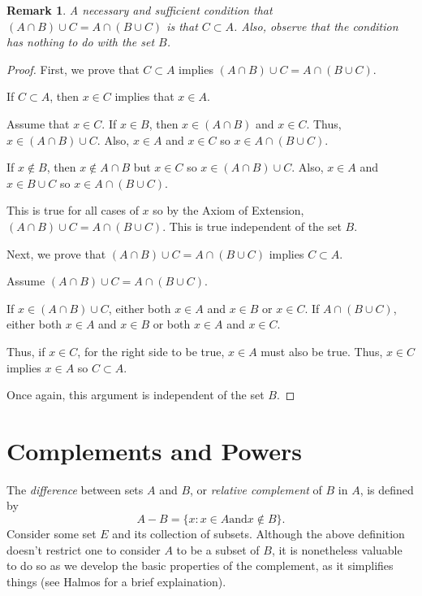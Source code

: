 \documentclass[12pt]{article}
\newtheorem{remark}{Remark}
\begin{document}
\begin{remark}
    A necessary and sufficient condition that $(A \cap B) \cup C = A \cap (B \cup C)$ is that $C \subset A$.
    Also, observe that the condition has nothing to do with the set $B$.
\end{remark}
\begin{proof}
    First, we prove that $C \subset A$ implies $(A \cap B) \cup C = A \cap (B \cup C)$.

    If $C \subset A$, then $x \in C$ implies that $x \in A$.

    Assume that $x \in C$. If $x \in B$, then $x \in (A \cap B)$ and $x \in C$. Thus, $x \in (A \cap B) \cup C$.
    Also, $x \in A$ and $x \in C$ so $x \in A \cap (B \cup C)$.

    If $x \notin B$, then $x \notin A \cap B$ but $x \in C$ so $x \in (A \cap B) \cup C$.
    Also, $x \in A$ and $x \in B \cup C$ so $x \in A \cap(B \cup C)$.

    This is true for all cases of $x$ so by the Axiom of Extension, $(A \cap B) \cup C = A \cap (B \cup C)$.
    This is true independent of the set $B$.

    Next, we prove that $(A \cap B) \cup C = A \cap (B \cup C)$ implies $C \subset A$.

    Assume $(A \cap B) \cup C = A \cap (B \cup C)$.

    If $x \in (A \cap B) \cup C$, either both $x \in A$ and $x \in B$ or $x \in C$.
    If $A \cap (B \cup C)$, either both $x \in A$ and $x \in B$ or both $x \in A$ and $x \in C$.

    Thus, if $x \in C$, for the right side to be true, $x \in A$ must also be true. Thus, $x \in C$ implies $x \in A$
    so $C \subset A$.

    Once again, this argument is independent of the set $B$.
\end{proof}

\section{Complements and Powers}
The \textit{difference}  between sets $A$ and $B$, or \textit{relative complement} of $B$ in $A$, is
defined by
\begin{equation}
    A- B = \{x: x \in A \text{and} x \notin B\}.
\end{equation}
Consider some set $E$ and its collection of subsets. Although the above definition doesn't restrict one
to consider $A$ to be a subset of $B$, it is nonetheless valuable to do so as we develop the basic properties
of the complement, as it simplifies things (see Halmos for a brief explaination).
\end{document}
